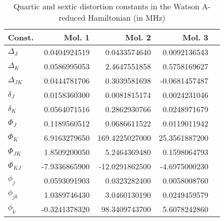 \begin{table}
\centering
\caption{Quartic and sextic distortion constants in the Watson A-reduced Hamiltonian (in MHz)}
\begin{tabular}{lrrrr}
Const.        &             Mol. 1 &             Mol. 2 &             Mol. 3 \\
\hline
$\Delta_{J}$  &       0.0404924519 &       0.0433574640 &       0.0092136543 \\
$\Delta_{K}$  &       0.0586995053 &       2.4647551858 &       0.5758169627 \\
$\Delta_{JK}$ &       0.0444781706 &       0.3039581698 &      -0.0681457487 \\
$\delta_{J}$  &       0.0158360300 &       0.0081815174 &       0.0024231046 \\
$\delta_{K}$  &       0.0564071516 &       0.2862930766 &       0.0248971679 \\
\hline
$\Phi_{J}$    &       0.1189560512 &       0.0686611522 &       0.0119011942 \\
$\Phi_{K}$    &       6.9163279650 &     169.4225027000 &      25.3561887200 \\
$\Phi_{JK}$   &       1.8509200050 &       5.2464369480 &       0.1598064793 \\
$\Phi_{KJ}$   &      -7.9336865900 &     -12.0291862500 &      -4.6975000230 \\
$\phi_{j}$    &       0.0593091903 &       0.0323282400 &       0.0058008760 \\
$\phi_{jk}$   &       1.0389746430 &       3.0460130190 &       0.0249459579 \\
$\phi_{k}$    &      -0.3241378320 &      98.3409743700 &       5.6078242860 \\
\end{tabular}
\end{table}


